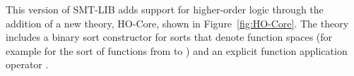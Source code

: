 \begin{newver}
%


This version of SMT-LIB adds support for higher-order logic through the addition
of a new theory, HO-Core, shown in Figure~\ref{fig:HO-Core}.
The theory includes a binary sort constructor \ter{->} for sorts 
that denote function spaces 
(for example  for the sort of functions from  to )
and an explicit function application operator \ter{\_}.


\end{newver}
